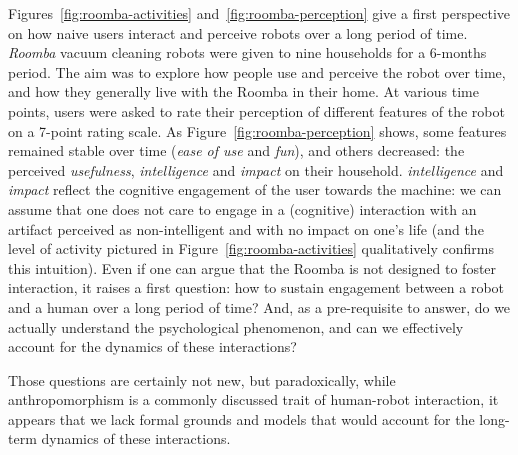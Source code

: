 \documentclass{frontiersSCNS} %
\begin{document}
Figures~\ref{fig:roomba-activities} and~\ref{fig:roomba-perception} give a first
perspective on how naive users interact and perceive robots over a long period
of time. \emph{Roomba} vacuum cleaning robots were given to nine
households for a 6-months period. The aim was to explore how people use and
perceive the robot over time, and how they generally live with the Roomba in
their home. At various time points, users were asked to rate their perception of
different features of the robot on a 7-point rating scale. As
Figure~\ref{fig:roomba-perception} shows, some features remained stable over
time (\emph{ease of use} and \emph{fun}), and others decreased: the perceived
\emph{usefulness}, \emph{intelligence} and \emph{impact} on their household.
\emph{intelligence} and \emph{impact} reflect the cognitive engagement of the
user towards the machine: we can assume that one does not care to engage in a
(cognitive) interaction with an artifact perceived as non-intelligent and with
no impact on one's life (and the level of activity pictured in
Figure~\ref{fig:roomba-activities} qualitatively confirms this intuition). Even
if one can argue that the Roomba is not designed to foster interaction, it
raises a first question: how to sustain engagement between a robot and a human
over a long period of time? And, as a pre-requisite to answer, do we actually
understand the psychological phenomenon, and can we effectively account for the
dynamics of these interactions?

Those questions are certainly not new, but paradoxically, while anthropomorphism
is a commonly discussed trait of human-robot interaction, it appears
that we lack formal grounds and models that would account for the long-term
dynamics of these interactions.
\end{document}

